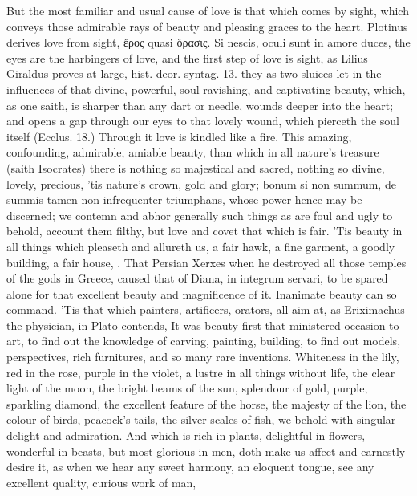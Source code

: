 {But the most familiar and usual cause of love is that which comes by
sight, which conveys those admirable rays of beauty and pleasing graces
to the heart. Plotinus derives love from sight, \textgreek{ἔρος} quasi \textgreek{ὅρασις}.
Si nescis, oculi sunt in amore duces, the eyes are the harbingers
of love, and the first step of love is sight, as Lilius Giraldus
proves at large, hist. deor. syntag. 13. they as two sluices let in the
influences of that divine, powerful, soul-ravishing, and captivating
beauty, which, as one saith, is sharper than any dart or needle,
wounds deeper into the heart; and opens a gap through our eyes to that
lovely wound, which pierceth the soul itself (Ecclus. 18.) Through it
love is kindled like a fire. This amazing, confounding, admirable,
amiable beauty, than which in all nature's treasure (saith
Isocrates) there is nothing so majestical and sacred, nothing so
divine, lovely, precious, 'tis nature's crown, gold and glory; bonum si
non summum, de summis tamen non infrequenter triumphans, whose power
hence may be discerned; we contemn and abhor generally such things as
are foul and ugly to behold, account them filthy, but love and covet
that which is fair. 'Tis  beauty in all things which pleaseth and
allureth us, a fair hawk, a fine garment, a goodly building, a fair
house, \etc{}. That Persian Xerxes when he destroyed all those temples of
the gods in Greece, caused that of Diana, in integrum servari, to be
spared alone for that excellent beauty and magnificence of it.
Inanimate beauty can so command. 'Tis that which painters, artificers,
orators, all aim at, as Eriximachus the physician, in Plato contends,
It was beauty first that ministered occasion to art, to find out
the knowledge of carving, painting, building, to find out models,
perspectives, rich furnitures, and so many rare inventions. Whiteness
in the lily, red in the rose, purple in the violet, a lustre in all
things without life, the clear light of the moon, the bright beams of
the sun, splendour of gold, purple, sparkling diamond, the excellent
feature of the horse, the majesty of the lion, the colour of birds,
peacock's tails, the silver scales of fish, we behold with singular
delight and admiration. And which is rich in plants, delightful
in flowers, wonderful in beasts, but most glorious in men, doth make us
affect and earnestly desire it, as when we hear any sweet harmony, an
eloquent tongue, see any excellent quality, curious work of man,
}
